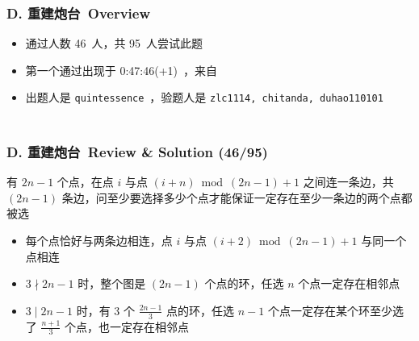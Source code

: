\documentclass[notheorems]{beamer}
\newcommand{\zhProbD}{重建炮台}			\newcommand{\DiffD}{Easy}		\newcommand{\AuthProbD}{\texttt{quintessence}}	\newcommand{\TestProbD}{\texttt{zlc1114, chitanda, duhao110101}}
\newcommand{\AccInProbD}{46}	\newcommand{\SubInProbD}{95}	\newcommand{\RatInProbD}{48.42\%}
\newcommand{\FirPenInProbD}{0:47:46(+1)}	\newcommand{\FirPerInProbD}{\Someone}
\begin{document}
\begin{frame}[label = ProbD]
\frametitle{\\ D. \zhProbD\ Overview}
\begin{spacing}{2.0} \large
\begin{itemize}
\item 通过人数 \AccInProbD\ 人，共 \SubInProbD\ 人尝试此题
\item 第一个通过出现于 \FirPenInProbD\ ，来自 \FirPerInProbD\ 
\item 出题人是 \AuthProbD\ ，验题人是 \TestProbD\
\end{itemize}
\end{spacing}
\end{frame}
\begin{frame}
\frametitle{\\ D. \zhProbD\ Review \& Solution (\AccInProbD/\SubInProbD)}
\begin{spacing}{1.5} \large
有 $2 n - 1$ 个点，在点 $i$ 与点 $(i + n) \bmod (2 n - 1) + 1$ 之间连一条边，共 $(2 n - 1)$ 条边，问至少要选择多少个点才能保证一定存在至少一条边的两个点都被选 \pause
\begin{itemize}[<+->]
\item 每个点恰好与两条边相连，点 $i$ 与点 $(i + 2) \bmod (2 n - 1) + 1$ 与同一个点相连
\item $3 \nmid 2 n - 1$ 时，整个图是 $(2n - 1)$ 个点的环，任选 $n$ 个点一定存在相邻点
\item $3 \mid 2 n - 1$ 时，有 $3$ 个 $\frac{2 n - 1}{3}$ 点的环，任选 $n - 1$ 个点一定存在某个环至少选了 $\frac{n + 1}{3}$ 个点，也一定存在相邻点
\end{itemize}
\end{spacing}
\end{frame}
\end{document}
